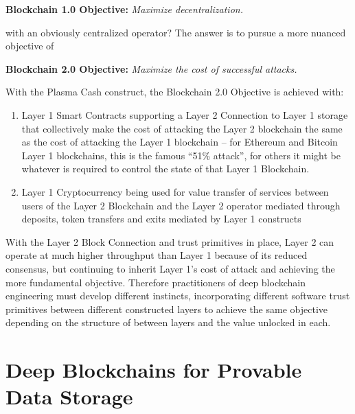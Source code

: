 \documentclass{article}
\begin{document}
\begin{center}
   {\bf Blockchain 1.0 Objective:} {\em Maximize decentralization.}
\end{center}

\noindent with an obviously centralized operator?   The answer is to pursue a more nuanced objective of

\begin{center}
   {\bf Blockchain 2.0 Objective:} {\em Maximize the cost of successful attacks.}
\end{center}

With the Plasma Cash construct, the Blockchain 2.0 Objective is achieved with:
\begin{enumerate}
    \item Layer 1 Smart Contracts supporting a Layer 2 Connection to Layer 1 storage that collectively make the cost of attacking the Layer 2 blockchain the same as the cost of attacking the Layer 1 blockchain -- for Ethereum and Bitcoin Layer 1 blockchains, this is the famous ``51\% attack'', for others it might be whatever is required to control the state of that Layer 1 Blockchain.
    \item Layer 1 Cryptocurrency being used for value transfer of services between users of the Layer 2 Blockchain and the Layer 2 operator mediated through deposits, token transfers and exits mediated by Layer 1 constructs
\end{enumerate}
With the Layer 2 Block Connection and trust primitives in place, Layer 2 can operate at much higher throughput than Layer 1 because of its reduced consensus, but continuing to inherit Layer 1's cost of attack and achieving the more fundamental objective.  Therefore practitioners of deep blockchain engineering must develop different instincts, incorporating different software trust primitives between different constructed layers to achieve the same objective depending on the structure of between layers and the value unlocked in each.

\section{Deep Blockchains for Provable Data Storage}
\end{document}
